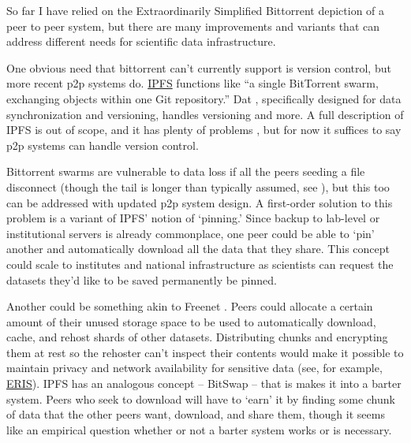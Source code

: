 So far I have relied on the Extraordinarily Simplified
Bittorrent depiction of a peer to peer system, but there
are many improvements and variants that can address different needs for
scientific data infrastructure.

One obvious need that bittorrent can't currently support is version
control, but more recent p2p systems do.
\href{https://ipfs.io/}{IPFS} functions like ``a single BitTorrent
swarm, exchanging objects within one Git repository.'' \citep{benetIPFSContentAddressed2014}  Dat \citep{ogdenDatDistributedDataset2017} , specifically designed for data synchronization and versioning,
handles versioning and more. A full description of IPFS is out of scope,
and it has plenty of problems \citep{patsakisHydrasIPFSDecentralised2019} , but for now it suffices to say
p2p systems can handle version control.

Bittorrent swarms are vulnerable to data loss if all the peers seeding a
file disconnect (though the tail is longer than typically assumed, see
\citep{zhangUnravelingBitTorrentEcosystem2011} ), but this too can
be addressed with updated p2p system design. A first-order solution to
this problem is a variant of IPFS' notion of `pinning.' Since backup to
lab-level or institutional servers is already commonplace, one peer
could be able to `pin' another and automatically download all the data
that they share. This concept could scale to institutes and national
infrastructure as scientists can request the datasets they'd like to be
saved permanently be pinned.

Another could be something akin to Freenet \citep{clarkeFreenetDistributedAnonymous2001} . Peers could allocate a
certain amount of their unused storage space to be used to automatically
download, cache, and rehost shards of other datasets. Distributing
chunks and encrypting them at rest so the rehoster can't inspect their
contents would make it possible to maintain privacy and network
availability for sensitive data (see, for example,
\href{https://inqlab.net/projects/eris/}{ERIS}). IPFS has an analogous
concept -- BitSwap -- that is makes it into a barter system. Peers who
seek to download will have to `earn' it by finding some chunk of data
that the other peers want, download, and share them, though it seems
like an empirical question whether or not a barter system works or is
necessary.

